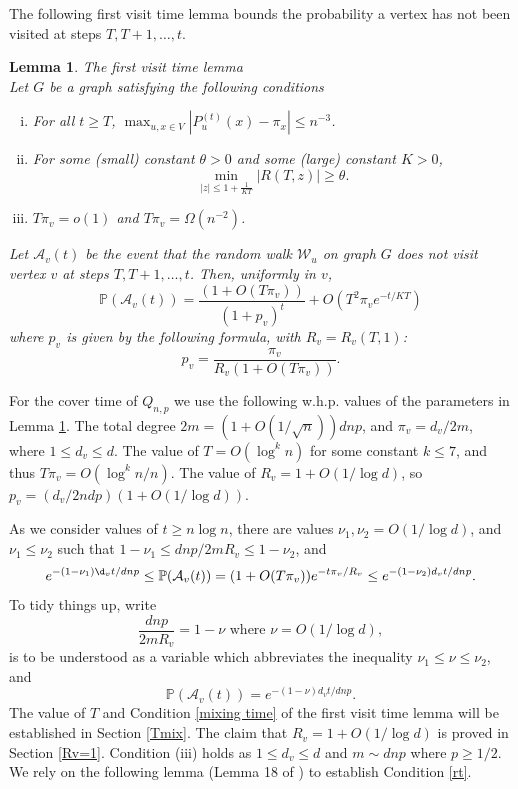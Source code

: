 \documentclass[12pt]{article}
\newtheorem{lemma}[theorem]{Lemma}
\def\Pr{\mathbb{P}}
\newcommand{\beq}[2]{\begin{equation}\label{#1}#2\end{equation}}
\begin{document}
The following first visit time lemma bounds the probability a vertex has not been visited at steps $T, T+1, \dots, t$.
\begin{lemma} \label{firstvisit}{\sc The first visit time lemma} \cite{CF}\\
Let $G$ be a graph satisfying the following conditions
\begin{enumerate}[(i)]
\item \label{mixing time} For all $t\geq T$, $\max_{u,x \in V} |P_u^{(t)}(x)- \pi_x|\leq n^{-3}$.
\item \label{rt} For some (small) constant $\theta>0$ and some (large) constant $K >0$,
\[ \min_{|z|\leq 1+ \frac{1}{KT}} |R(T,z)| \geq \theta.
\]
\item $T\pi_v=o(1)$ and $T\pi_v = \Omega(n^{-2})$.
\end{enumerate}
Let $\mathcal{A}_v(t)$ be the event that the random walk $\mathcal{W}_u$ on graph $G$ does not visit vertex $v$ at steps $T, T+1, \dots, t$. Then, uniformly in $v$,
$$\Pr(\mathcal{A}_v(t)) = \frac{(1+O(T\pi_v))}{(1+p_v)^t} +O(T^2 \pi_v e^{-t/KT})$$
where $p_v$ is given by the following formula, with $R_v= R_v(T,1)$:
$$
p_v= \frac{\pi_v}{R_v(1+O(T\pi_v))}.
$$
\end{lemma}

For the cover time of $Q_{n,p}$ we use the following w.h.p. values of the parameters  in Lemma \ref{firstvisit}.
The total degree  $2m =(1+O( 1/\sqrt n) ) dnp$, and $\pi_v=d_v/2m$, where $1 \le d_v \le d$.
 The value of
$T=O(\log^k n)$ for some  constant $k \le 7$, and thus $T\pi_v=O(\log^k n/n)$.
The value of
$R_v=1+O(1/\log d)$, so $p_v=(d_v/2ndp)(1+O(1/\log d))$.

As we consider values of  $t \ge n \log n$,  there are  values $\nu_1,\nu_2  =O(1/\log d)$, and  $\nu_1 \le \nu_2$ such that  $1-\nu_1 \le dnp/2mR_v \le 1-\nu_2$, and
\[
e^{-(1-\nu_1)\d_v t/dnp} \le \Pr(\mathcal{A}_v(t)) = (1+O(T\pi_v)) e^{-t\pi_v/R_v} \le  e^{-(1-\nu_2)d_v t/dnp}
.
\]
To tidy things up, write
\beq{defmu}{
\frac{dnp}{2mR_v} =1-\nu\text{ where }\nu=O(1/\log d),
}
 is to be understood as a variable which abbreviates the  inequality  $\nu_1 \le \nu \le \nu_2$, and
\beq{PrAt}{
\Pr(\mathcal{A}_v(t))  = e^{-(1-\nu)d_v t/dnp}.
}
The value of $T$ and Condition \eqref{mixing time} of the first visit time lemma will be established in Section \ref{Tmix}.
The claim that $R_v =1 +O(1/\log d)$ is proved in Section \ref{Rv=1}.
Condition (iii) holds as $1 \le d_v \le d$ and $m \sim dnp$ where $p \ge 1/2$.
 We rely on the following lemma (Lemma 18 of \cite{Hyp}) to establish Condition \eqref{rt}.
\end{document}
